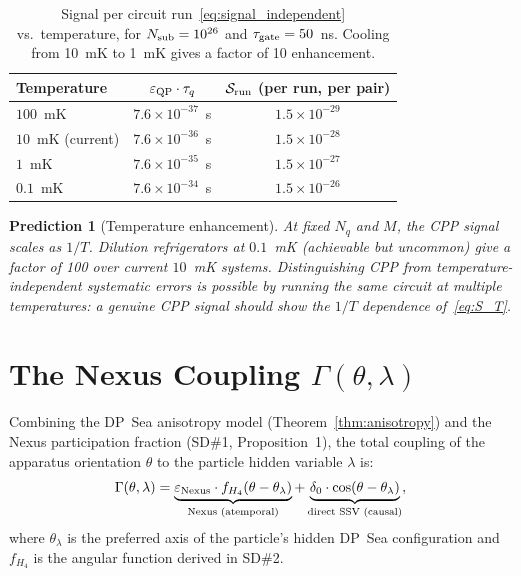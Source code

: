 \documentclass[11pt,a4paper]{article}
\newtheorem{prediction}[theorem]{Prediction}
\newcommand{\eps}{\varepsilon}
\begin{document}
\begin{table}[H]
\centering
\caption{Signal per circuit run~\eqref{eq:signal_independent} vs.\
  temperature, for $N_{\rm sub} = 10^{26}$ and
  $\tau_{\rm gate} = 50$~ns.  Cooling from 10~mK to 1~mK gives
  a factor of 10 enhancement.}
\label{tab:signal_T}
\begin{tabular}{@{}lcc@{}}
\toprule
Temperature & $\eps_{\rm QP}\cdot\tau_q$ & $\mathcal{S}_{\rm run}$
  (per run, per pair) \\
\midrule
$100$~mK & $7.6\times10^{-37}$~s & $1.5\times10^{-29}$ \\
$10$~mK (current) & $7.6\times10^{-36}$~s & $1.5\times10^{-28}$ \\
$1$~mK & $7.6\times10^{-35}$~s & $1.5\times10^{-27}$ \\
$0.1$~mK & $7.6\times10^{-34}$~s & $1.5\times10^{-26}$ \\
\bottomrule
\end{tabular}
\end{table}

\begin{prediction}[Temperature enhancement]
\label{pred:temperature}
At fixed $N_q$ and $M$, the CPP signal scales as $1/T$.
Dilution refrigerators at $0.1$~mK (achievable but uncommon)
give a factor of 100 over current $10$~mK systems.
Distinguishing CPP from temperature-independent systematic errors
is possible by running the same circuit at multiple temperatures:
a genuine CPP signal should show the $1/T$ dependence of~\eqref{eq:S_T}.
\end{prediction}

\section{The Nexus Coupling $\Gamma(\theta, \lambda)$}
\label{sec:nexus_coupling}

Combining the DP~Sea anisotropy model (Theorem~\ref{thm:anisotropy})
and the Nexus participation fraction (SD\#1, Proposition~1), the
total coupling of the apparatus orientation $\theta$ to the particle
hidden variable $\lambda$ is:
\begin{equation}
\Gamma(\theta, \lambda)
= \underbrace{\eps_{\rm Nexus} \cdot f_{H_4}(\theta - \theta_\lambda)}
             _{\text{Nexus (atemporal)}}
+ \underbrace{\delta_0 \cdot \cos(\theta - \theta_\lambda)}
             _{\text{direct SSV (causal)}},
\label{eq:Gamma_total}
\end{equation}
where $\theta_\lambda$ is the preferred axis of the particle's
hidden DP~Sea configuration and $f_{H_4}$ is the angular function
derived in SD\#2.
\end{document}
